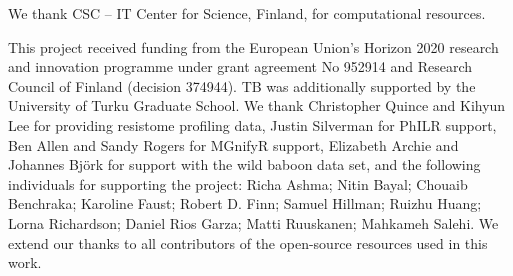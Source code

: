 \documentclass[
  sn-nature,
]{sn-jnl}
\begin{document}
We thank CSC -- IT Center for Science, Finland, for computational
resources.

This project received funding from the European Union's Horizon 2020
research and innovation programme under grant agreement No 952914 and
Research Council of Finland (decision 374944). TB was additionally
supported by the University of Turku Graduate School. We thank
Christopher Quince and Kihyun Lee for providing resistome profiling
data, Justin Silverman for PhILR support, Ben Allen and Sandy Rogers for
MGnifyR support, Elizabeth Archie and Johannes Björk for support with
the wild baboon data set, and the following individuals for supporting
the project: Richa Ashma; Nitin Bayal; Chouaib Benchraka; Karoline
Faust; Robert D. Finn; Samuel Hillman; Ruizhu Huang; Lorna Richardson;
Daniel Rios Garza; Matti Ruuskanen; Mahkameh Salehi. We extend our
thanks to all contributors of the open-source resources used in this
work.
\end{document}
